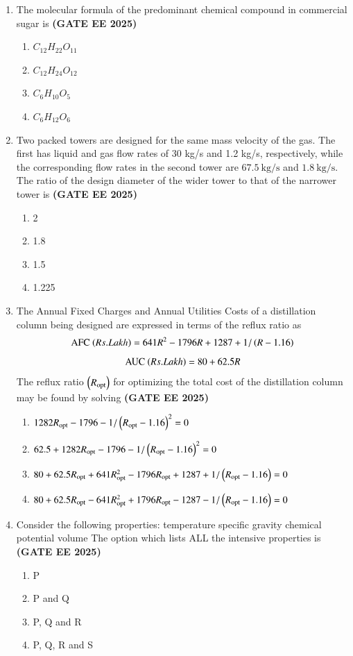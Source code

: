 \documentclass[journal,12pt,onecolumn]{IEEEtran}
\theoremstyle{remark}
\begin{document}
\begin{enumerate}
\item The molecular formula of the predominant chemical compound in commercial sugar is
\hfill \textbf{(GATE EE 2025)} \begin{enumerate}
    \item $C_{12}H_{22}O_{11}$
    \item $C_{12}H_{24}O_{12}$
    \item $C_{6}H_{10}O_{5}$
    \item $C_{6}H_{12}O_{6}$
\end{enumerate}


\item  Two packed towers are designed for the same mass velocity of the gas. The first has liquid and gas flow rates of 30 kg/s and 1.2 kg/s, respectively, while the corresponding flow rates in the second tower are $67.5~\text{kg/s}$ and $1.8~\text{kg/s}$. The ratio of the design diameter of the wider tower to that of the narrower tower is
\hfill \textbf{(GATE EE 2025)} \begin{enumerate}
    \item 2
    \item 1.8
    \item 1.5
    \item 1.225
\end{enumerate}

\item The Annual Fixed Charges  and Annual Utilities Costs  of a distillation column being designed are expressed in terms of the reflux ratio  as
\[ \text{AFC \ensuremath{\left(Rs. Lakh\right)}} = 641 R^{2}-1796 R+1287+1/\left(R-1.16\right) \]
\[ \text{AUC \ensuremath{\left(Rs. Lakh\right)}} = 80+62.5 R \]
The reflux ratio $\left(R_{\text{opt}}\right)$ for optimizing the total cost of the distillation column may be found by solving
\hfill \textbf{(GATE EE 2025)} \begin{enumerate}
    \item $1282 R_{\text{opt}}-1796-1/\left(R_{\text{opt}}-1.16\right)^{2}=0$
    \item $62.5+1282 R_{\text{opt}}-1796-1/\left(R_{\text{opt}}-1.16\right)^{2}=0$
    \item $80+62.5 R_{\text{opt}}+641 R_{\text{opt}}^{2}-1796 R_{\text{opt}}+1287+1/\left(R_{\text{opt}}-1.16\right)=0$
    \item $80+62.5 R_{\text{opt}}-641 R_{\text{opt}}^{2}+1796 R_{\text{opt}}-1287-1/\left(R_{\text{opt}}-1.16\right)=0$
\end{enumerate}

\item Consider the following properties:
 temperature
 specific gravity
 chemical potential
 volume
The option which lists ALL the intensive properties is
\hfill \textbf{(GATE EE 2025)} \begin{enumerate}
    \item P
    \item P and Q
    \item P, Q and R
    \item P, Q, R and S
	    

\end{enumerate}
\end{enumerate}
\end{document}
